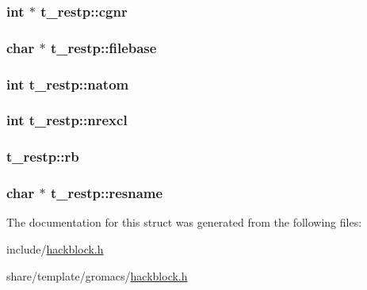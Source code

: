 \hypertarget{structt__restp_adb1b530fdf93bf5d9360080e17713b40}{
\subsubsection[{cgnr}]{\setlength{\rightskip}{0pt plus 5cm}int $\ast$ {\bf t\-\_\-restp\-::cgnr}}}\label{structt__restp_adb1b530fdf93bf5d9360080e17713b40}
\hypertarget{structt__restp_af257d41f27e87dd4e66e8db01d16e3b4}{
\subsubsection[{filebase}]{\setlength{\rightskip}{0pt plus 5cm}char $\ast$ {\bf t\-\_\-restp\-::filebase}}}\label{structt__restp_af257d41f27e87dd4e66e8db01d16e3b4}
\hypertarget{structt__restp_a2bfb023ae6f44605304f224ec3a24ff9}{
\subsubsection[{natom}]{\setlength{\rightskip}{0pt plus 5cm}int {\bf t\-\_\-restp\-::natom}}}\label{structt__restp_a2bfb023ae6f44605304f224ec3a24ff9}
\hypertarget{structt__restp_a9b262c7dae8aee0bfedc688a87808cfe}{
\subsubsection[{nrexcl}]{\setlength{\rightskip}{0pt plus 5cm}int {\bf t\-\_\-restp\-::nrexcl}}}\label{structt__restp_a9b262c7dae8aee0bfedc688a87808cfe}
\hypertarget{structt__restp_acd184d45cd32f8d97dd4e66944bbb14a}{
\subsubsection[{rb}]{ {\bf t\-\_\-restp\-::rb}}}\label{structt__restp_acd184d45cd32f8d97dd4e66944bbb14a}
\hypertarget{structt__restp_a2c4efbe22be9f4c90587ce399eaf98bc}{
\subsubsection[{resname}]{\setlength{\rightskip}{0pt plus 5cm}char $\ast$ {\bf t\-\_\-restp\-::resname}}}\label{structt__restp_a2c4efbe22be9f4c90587ce399eaf98bc}


\-The documentation for this struct was generated from the following files\-:\begin{DoxyCompactItemize}
\item 
include/\hyperlink{include_2hackblock_8h}{hackblock.\-h}\item 
share/template/gromacs/\hyperlink{share_2template_2gromacs_2hackblock_8h}{hackblock.\-h}\end{DoxyCompactItemize}
